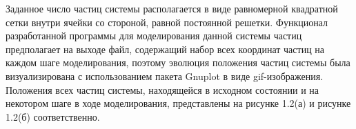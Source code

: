 \documentclass[14pt,a4paper,report]{ncc}
\begin{document}
Заданное число частиц системы располагается в виде равномерной квадратной сетки внутри ячейки со стороной, равной постоянной решетки. Функционал разработанной программы для моделирования данной системы частиц предполагает на выходе файл, содержащий набор всех координат частиц на каждом шаге моделирования, поэтому эволюция положения частиц системы была визуализирована с использованием пакета Gnuplot в виде gif-изображения. Положения всех частиц системы, находящейся в исходном состоянии и на некотором шаге в ходе моделирования, представлены на рисунке 1.2(а) и рисунке 1.2(б) соответственно.


\begin{figure}[b]
\begin{minipage}[b]{0.5\linewidth}
\end{minipage}
\hfill
\begin{minipage}[b]{0.5\linewidth}

\end{minipage}
\end{figure}
\end{document}
